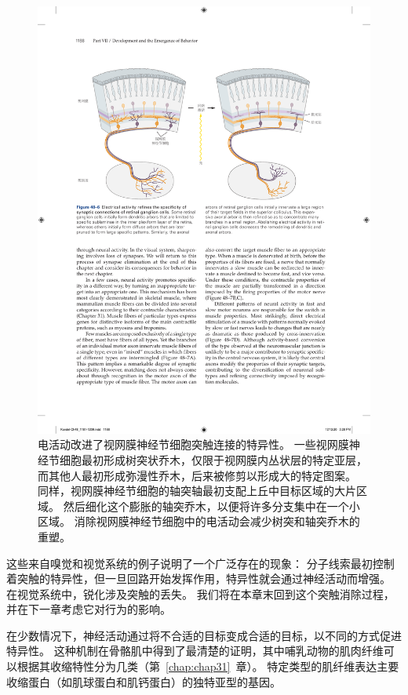 \begin{figure}[htbp]
	\centering
	\includegraphics[width=1.0\linewidth]{chap48/fig_48_6}
	\caption{电活动改进了视网膜神经节细胞突触连接的特异性。
		一些视网膜神经节细胞最初形成树突状乔木，仅限于视网膜内丛状层的特定亚层，而其他人最初形成弥漫性乔木，后来被修剪以形成大的特定图案。
		同样，视网膜神经节细胞的轴突轴最初支配上丘中目标区域的大片区域。
		然后细化这个膨胀的轴突乔木，以便将许多分支集中在一个小区域。
		消除视网膜神经节细胞中的电活动会减少树突和轴突乔木的重塑。}
	\label{fig:48_6}
\end{figure}


这些来自嗅觉和视觉系统的例子说明了一个广泛存在的现象：
分子线索最初控制着突触的特异性，但一旦回路开始发挥作用，特异性就会通过神经活动而增强。
在视觉系统中，锐化涉及突触的丢失。
我们将在本章末回到这个突触消除过程，并在下一章考虑它对行为的影响。


在少数情况下，神经活动通过将不合适的目标变成合适的目标，以不同的方式促进特异性。
这种机制在骨骼肌中得到了最清楚的证明，其中哺乳动物的肌肉纤维可以根据其收缩特性分为几类（第~\ref{chap:chap31}~章）。
特定类型的肌纤维表达主要收缩蛋白（如肌球蛋白和肌钙蛋白）的独特亚型的基因。


